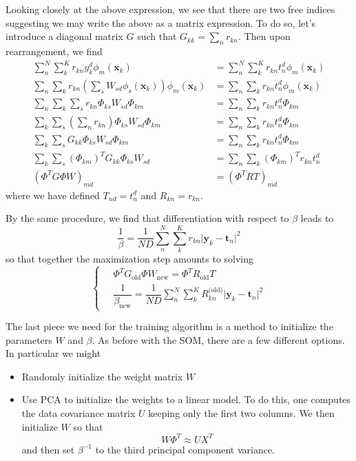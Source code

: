 Looking closely at the above expression, we see that there are two free indices suggesting we may write the above as a matrix expression. To do so, let's introduce a diagonal matrix $G$ such that $G_{kk} = \sum_nr_{kn}$. Then upon rearrangement, we find
\begin{align}
  \sum_n^N\sum_k^K r_{kn}y_k^d\phi_m(\mathbf{x}_k) &= \sum_n^N\sum_k^K r_{kn}t_n^d\phi_m(\mathbf{x}_k) \\
  \sum_n\sum_k r_{kn}\left(\sum_sW_{sd}\phi_s(\mathbf{x}_k)\right)\phi_m(\mathbf{x}_k) &= \sum_n\sum_k r_{kn}t_n^d\phi_m(\mathbf{x}_k) \\
  \sum_n\sum_k\sum_s r_{kn}\Phi_{ks}W_{sd}\Phi_{km} &= \sum_n\sum_k r_{kn}t_n^d\Phi_{km} \\
  \sum_k\sum_s \left( \sum_n r_{kn}\right)\Phi_{ks}W_{sd}\Phi_{km} &= \sum_n\sum_k r_{kn}t_n^d\Phi_{km} \\
  \sum_k\sum_s G_{kk}\Phi_{ks}W_{sd}\Phi_{km} &= \sum_n\sum_k r_{kn}t_n^d\Phi_{km} \\
  \sum_k\sum_s (\Phi_{km})^TG_{kk}\Phi_{ks}W_{sd} &= \sum_n\sum_k (\Phi_{km})^Tr_{kn}t_n^d \\
  \left( \Phi^TG\Phi W \right)_{md} &= \left( \Phi^TRT \right)_{md}
\end{align}
where we have defined $T_{nd}=t_n^d$ and $R_{kn} = r_{kn}$.

By the same procedure, we find that differentiation with respect to $\beta$ leads to
\begin{equation}
  \frac{1}{\beta} = \frac{1}{ND}\sum_n^N\sum_k^K r_{kn}\lvert \mathbf{y}_k-\mathbf{t}_n\rvert^2
\end{equation}
so that together the maximization step amounts to solving
\begin{equation}
  \begin{cases}
    \quad \Phi^TG_{\text{old}}\Phi W_{\text{new}} = \Phi^T R_{\text{old}} T \\
    \quad \dfrac{1}{\beta_{\text{new}}} = \dfrac{1}{ND}\sum\limits_n^N\sum\limits_k^KR_{kn}^{\text{(old)}}\lvert \mathbf{y}_k - \mathbf{t}_n \rvert^2
  \end{cases}
\end{equation}

The last piece we need for the training algorithm is a method to initialize the parameters $W$ and $\beta$. As before with the SOM, there are a few different options. In particular we might
\begin{itemize}
  \item Randomly initialize the weight matrix $W$
  \item Use PCA to initialize the weights to a linear model. To do this, one computes the data covariance matrix $U$ keeping only the first two columns. We then initialize $W$ so that
      \begin{equation}
        W\Phi^T \approx UX^T
      \end{equation}
      and then set $\beta^{-1}$ to the third principal component variance.
\end{itemize}

